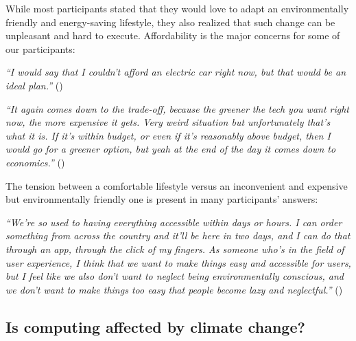     While most participants stated that they would love to adapt an environmentally friendly and energy-saving lifestyle, they also realized that such change can be unpleasant and hard to execute. Affordability is the major concerns for some of our participants: %
    
    \begin{quoting}
        \textit{``I would say that I couldn't afford an electric car right now, but that would be an ideal plan.''} ()
    \end{quoting}
    
    \begin{quoting}
        \textit{``It again comes down to the trade-off, because the greener the tech you want right now, the more expensive it gets. Very weird situation but unfortunately that's what it is. If it's within budget, or even if it's reasonably above budget, then I would go for a greener option, but yeah at the end of the day it comes down to economics.''} ()
    \end{quoting}
    
    The tension between a comfortable lifestyle versus an inconvenient and expensive but environmentally friendly one is present in many participants' answers: %
    
    \begin{quoting}
        \textit{``We're so used to having everything accessible within days or hours. I can order something from across the country and it'll be here in two days, and I can do that through an app, through the click of my fingers. As someone who's in the field of user experience, I think that we want to make things easy and accessible for users, but I feel like we also don't want to neglect being environmentally conscious, and we don't want to make things too easy that people become lazy and neglectful.''} ()
    \end{quoting}

    
\subsection{Is computing affected by climate change?}

    
    
